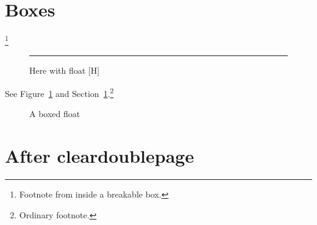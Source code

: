 \documentclass[twoside]{article}
\begin{document}
\section{Boxes}\label{sec:a}
\lipsum[1-2]
\begin{tcolorbox}[breakable,title=Breakable box across columns]
\lipsum[3-7]\footnote{Footnote from inside a breakable box.}
\end{tcolorbox}
\lipsum[8]
\begin{figure}[H]\centering\rule{.8\linewidth}{2cm}\caption{Here with float [H]}\label{fig:h}\end{figure}
\lipsum[9-12] See Figure~\ref{fig:h} and Section~\ref{sec:a}.\footnote{Ordinary footnote.}
\begin{tcolorbox}[breakable,enhanced,colback=yellow!10,title=Breakable box across a page]
\lipsum[13-24]
\end{tcolorbox}
\begin{figure}[span=2,at=tr]
\begin{tcolorbox}[title=tcolorbox inside a two-column float]\lipsum[2]\end{tcolorbox}
\caption{A boxed float}\end{figure}
\lipsum[25-34]
\lipsum[35-40]
\cleardoublepage
\section{After cleardoublepage}
\lipsum[41-44]
\end{document}
